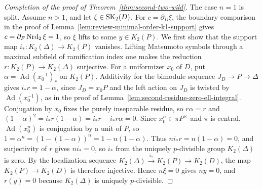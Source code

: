 \begin{proof}[Completion of the proof of Theorem~\ref{thm:second-two-wild}]
The case $n=1$ is split.
Assume $n>1$, and let $\xi\in\operatorname{SK}_2(D)$.
For $c=\partial_D\xi$, the boundary comparison in the proof of Lemma~\ref{lem:review-minimal-order-k1-support} gives $c=\partial_F\operatorname{Nrd}_2\xi=1$, so $\xi$ lifts to some $y\in K_2(P)$.
We first show that the support map $i_*\colon K_2(\Delta)\to K_2(P)$ vanishes.
Lifting Matsumoto symbols through a maximal subfield of ramification index one makes the reduction $r\colon K_2(P)\to K_2(\Delta)$ surjective.
For a uniformizer $x_0$ of $D$, put $\alpha=\operatorname{Ad}(x_0^{-1})_*$ on $K_2(P)$.
Additivity for the bimodule sequence $J_D\to P\to\Delta$ gives $i_*r=1-\alpha$, since $J_D=x_0P$ and the left action on $J_D$ is twisted by $\operatorname{Ad}(x_0^{-1})$, as in the proof of Lemma~\ref{lem:second-residue-zero-ell-integral}.
Conjugation by $x_0$ fixes the purely inseparable residue, so $r\alpha=r$ and $(1-\alpha)^2=i_*r(1-\alpha)=i_*r-i_*r\alpha=0$.
Since $x_0^n\in\pi P^\times$ and $\pi$ is central, $\operatorname{Ad}(x_0^n)$ is conjugation by a unit of $P$, so $1=\alpha^n=(1-(1-\alpha))^n=1-n(1-\alpha)$.
Thus $ni_*r=n(1-\alpha)=0$, and surjectivity of $r$ gives $ni_*=0$, so $i_*$ from the uniquely $p$-divisible group $K_2(\Delta)$ is zero.
By the localization sequence $K_2(\Delta)\xrightarrow{i_*}K_2(P)\to K_2(D)$, the map $K_2(P)\to K_2(D)$ is therefore injective.
Hence $n\xi=0$ gives $ny=0$, and $r(y)=0$ because $K_2(\Delta)$ is uniquely $p$-divisible.


\end{proof}
